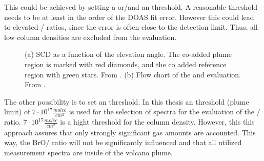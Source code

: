 This could be achieved by setting a  or/and an  threshold. A reasonable  threshold needs to be at least in the order of the DOAS fit error. However this could lead to elevated / ratios, since the  error is often close to the detection limit. Thus, all low  column densities are excluded from the evaluation.
%
\begin{figure}
	\caption{(a)  SCD as a function of the elevation angle. The co-added plume region is marked with red diamonds, and the co added reference region with green stars. From \cite{WarnachSimon}. (b) Flow chart of the   and  evaluation. From \cite{lubcke2014optical}.}
	\label{fig:algorithm}
\end{figure}
The other possibility is to set an  threshold. In this thesis an  threshold (plume limit) of $7\cdot 10^{17} \frac{molec}{cm^2}$ is used for the selection of spectra for the evaluation of the / ratio. $7\cdot 10^{17} \frac{molec}{cm^2}$ is a hight threshold for the column density. However, this this approach assures that only strongly significant gas amounts are accounted. This way, the BrO/ ratio will not be significantly influenced \citep{lubcke2014bro} and that all utilized measurement spectra are inside of the volcano plume. \\
